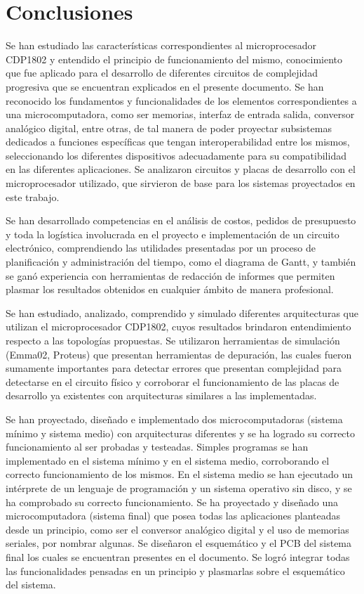  \chapter{Conclusiones}
\label{C:conclusiones}

Se han estudiado las características correspondientes al microprocesador CDP1802 y entendido el principio de funcionamiento del mismo, conocimiento que fue aplicado para el desarrollo de diferentes circuitos de complejidad progresiva que se encuentran explicados en el presente documento. Se han reconocido los fundamentos y funcionalidades de los elementos correspondientes a una microcomputadora, como ser memorias, interfaz de entrada salida, conversor analógico digital, entre otras, de tal manera de poder proyectar subsistemas dedicados a funciones específicas que tengan interoperabilidad entre los mismos, seleccionando los diferentes dispositivos adecuadamente para su compatibilidad en las diferentes aplicaciones. Se analizaron circuitos y placas de desarrollo con el microprocesador utilizado, que sirvieron de base para los sistemas proyectados en este trabajo. 

Se han desarrollado competencias en el análisis de costos, pedidos de presupuesto y toda la logística involucrada en el proyecto e implementación de un circuito electrónico, comprendiendo las utilidades presentadas por un proceso de planificación y administración del tiempo, como el diagrama de Gantt, y también se ganó experiencia con herramientas de redacción de informes que permiten plasmar los resultados obtenidos en cualquier ámbito de manera profesional. 

Se han estudiado, analizado, comprendido y simulado diferentes arquitecturas que utilizan el microprocesador CDP1802, cuyos resultados brindaron entendimiento respecto a las topologías propuestas. Se utilizaron herramientas de simulación (Emma02, Proteus) que presentan herramientas de depuración, las cuales fueron sumamente importantes para detectar errores que presentan complejidad para detectarse en el circuito físico y corroborar el funcionamiento de las placas de desarrollo ya existentes con arquitecturas similares a las implementadas.

Se han proyectado, diseñado e implementado dos microcomputadoras (sistema mínimo y sistema medio) con arquitecturas diferentes y se ha logrado su correcto funcionamiento al ser probadas y testeadas. Simples programas se han implementado en el sistema mínimo y en el sistema medio, corroborando el correcto funcionamiento de los mismos. En el sistema medio se han ejecutado un intérprete de un lenguaje de programación y un sistema operativo sin disco, y se ha comprobado su correcto funcionamiento. Se ha proyectado y diseñado una microcomputadora (sistema final) que posea todas las aplicaciones planteadas desde un principio, como ser el conversor analógico digital y el uso de memorias seriales, por nombrar algunas. Se diseñaron el esquemático y el PCB del sistema final los cuales se encuentran presentes en el documento. Se logró integrar todas las funcionalidades pensadas en un principio y plasmarlas sobre el esquemático del sistema. 

